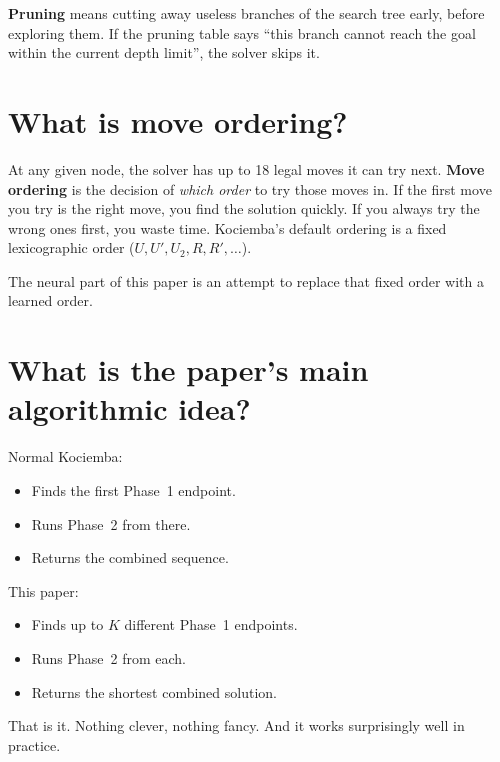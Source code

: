 \documentclass[11pt,a4paper]{article}
\newcommand{\defn}[1]{\textbf{#1}}
\begin{document}
\defn{Pruning} means cutting away useless branches of the search tree
early, before exploring them. If the pruning table says ``this branch
cannot reach the goal within the current depth limit'', the solver
skips it.

\section{What is move ordering?}

At any given node, the solver has up to 18 legal moves it can try next.
\defn{Move ordering} is the decision of \emph{which order} to try those
moves in. If the first move you try is the right move, you find the
solution quickly. If you always try the wrong ones first, you waste
time. Kociemba's default ordering is a fixed lexicographic order
($U, U', U_2, R, R', \ldots$).

The neural part of this paper is an attempt to replace that fixed order
with a learned order.

\section{What is the paper's main algorithmic idea?}

Normal Kociemba:

\begin{itemize}[leftmargin=2em]
  \item Finds the first Phase~1 endpoint.
  \item Runs Phase~2 from there.
  \item Returns the combined sequence.
\end{itemize}

This paper:

\begin{itemize}[leftmargin=2em]
  \item Finds up to $K$ different Phase~1 endpoints.
  \item Runs Phase~2 from each.
  \item Returns the shortest combined solution.
\end{itemize}

That is it. Nothing clever, nothing fancy. And it works surprisingly
well in practice.
\end{document}

